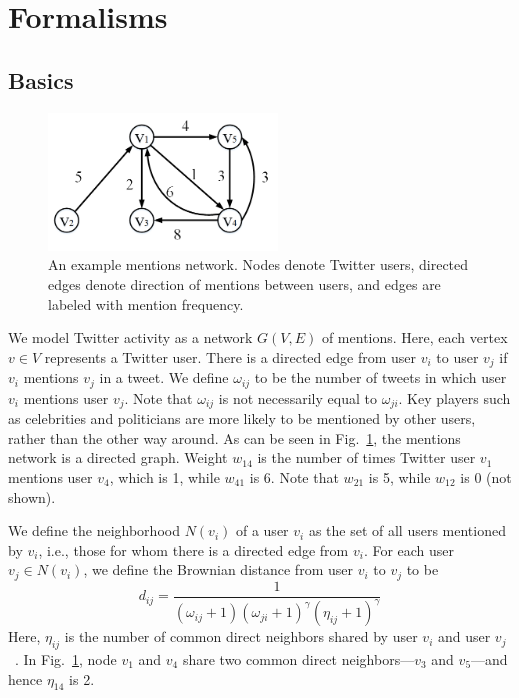 
\section{Formalisms}

\subsection{Basics}
\begin{figure}[th]
\centering
\includegraphics[width=2.4in]{figures/mention_network.png} %
\caption{An example mentions network. Nodes denote Twitter users,
directed edges denote direction of mentions between users, and edges
are labeled with mention frequency.}
\label{fig:mention_network}
\end{figure}

We model Twitter activity as a network $G(V,E)$ of mentions.
Here, each vertex $v \in V$ represents a Twitter user.
There is a directed edge from user $v_i$ to user $v_j$
if $v_i$ mentions $v_j$ in
a tweet.
We define $\omega_{ij}$ to be the number of tweets in which user $v_i$ mentions user $v_j$. Note that $\omega_{ij}$ is not necessarily equal to $\omega_{ji}$.
Key players such as celebrities and politicians are more
likely to be mentioned by other users, rather than the other way around.
As can be seen in Fig.~\ref{fig:mention_network}, the mentions network
is a directed graph. Weight $w_{14}$ is the number of times Twitter user $v_1$ mentions user $v_4$, which is 1, while $w_{41}$ is 6. Note
that $w_{21}$ is 5, while $w_{12}$ is 0 (not shown).

We define the neighborhood $N(v_i)$ of a user $v_i$ as the set of all users
mentioned by $v_i$, i.e., those for whom there is a directed edge from
$v_i$.
For each user $v_j \in N(v_i)$, we define the Brownian distance from user $v_i$ to $v_j$ to be
\begin{equation}
 d_{ij}=\frac{1}{(\omega_{ij}+1)(\omega_{ji}+1)^\gamma(\eta_{ij}+1)^\gamma}
\end{equation}
Here, $\eta_{ij}$ is the number of common direct neighbors shared by user $v_i$ and user $v_j$~\cite{zhou2004network}. In Fig.~\ref{fig:mention_network}, node $v_1$ and $v_4$ share two common direct neighbors---$v_3$ and $v_5$---and
hence $\eta_{14}$ is 2.


